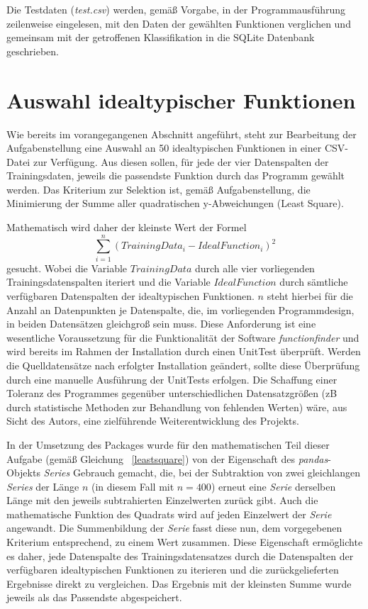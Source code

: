 Die Testdaten (\emph{test.csv}) werden, gemäß Vorgabe, in der Programmausführung zeilenweise eingelesen, mit den Daten der gewählten Funktionen verglichen und gemeinsam mit der getroffenen Klassifikation in die SQLite Datenbank geschrieben.


\section{Auswahl idealtypischer Funktionen}

Wie bereits im vorangegangenen Abschnitt angeführt, steht zur Bearbeitung der Aufgabenstellung eine Auswahl an 50 idealtypischen Funktionen in einer CSV-Datei zur Verfügung. Aus diesen sollen, für jede der vier Datenspalten der Trainingsdaten, jeweils die passendste Funktion durch das Programm gewählt werden. Das Kriterium zur Selektion ist, gemäß Aufgabenstellung, die Minimierung der Summe aller quadratischen y-Abweichungen (Least Square).

Mathematisch wird daher der kleinste Wert der Formel
\begin{equation}  
\sum_{i=1}^{n}(TrainingData_{i} - IdealFunction_{i})^2
\label{leastsquare}
\end{equation}
gesucht. Wobei die Variable $TrainingData$ durch alle vier vorliegenden Trainingsdatenspalten iteriert und die Variable $IdealFunction$ durch sämtliche verfügbaren Datenspalten der idealtypischen Funktionen. $n$ steht hierbei für die Anzahl an Datenpunkten je Datenspalte, die, im vorliegenden Programmdesign, in beiden Datensätzen gleichgroß sein muss. Diese Anforderung ist eine wesentliche Voraussetzung für die Funktionalität der Software \emph{functionfinder} und wird bereits im Rahmen der Installation durch einen UnitTest überprüft. Werden die Quelldatensätze nach erfolgter Installation geändert, sollte diese Überprüfung durch eine manuelle Ausführung der UnitTests erfolgen. Die Schaffung einer Toleranz des Programmes gegenüber unterschiedlichen Datensatzgrößen (zB durch statistische Methoden zur Behandlung von fehlenden Werten) wäre, aus Sicht des Autors, eine zielführende Weiterentwicklung des Projekts.

In der Umsetzung des Packages wurde für den mathematischen Teil dieser Aufgabe (gemäß Gleichung ~\ref{leastsquare})  von der Eigenschaft des \emph{pandas}-Objekts \emph{Series} Gebrauch gemacht, die, bei der Subtraktion von zwei gleichlangen \emph{Series} der Länge $n$ (in diesem Fall mit $n=400$) erneut eine \emph{Serie} derselben Länge mit den jeweils subtrahierten Einzelwerten zurück gibt. Auch die mathematische Funktion des Quadrats wird auf jeden Einzelwert der \emph{Serie} angewandt. Die Summenbildung der \emph{Serie} fasst diese nun, dem vorgegebenen Kriterium entsprechend, zu einem Wert zusammen.
Diese Eigenschaft ermöglichte es daher, jede Datenspalte des Trainingsdatensatzes durch die Datenspalten der verfügbaren idealtypischen Funktionen zu iterieren und die zurückgelieferten Ergebnisse direkt zu vergleichen. Das Ergebnis mit der kleinsten Summe wurde jeweils als das Passendste abgespeichert.

